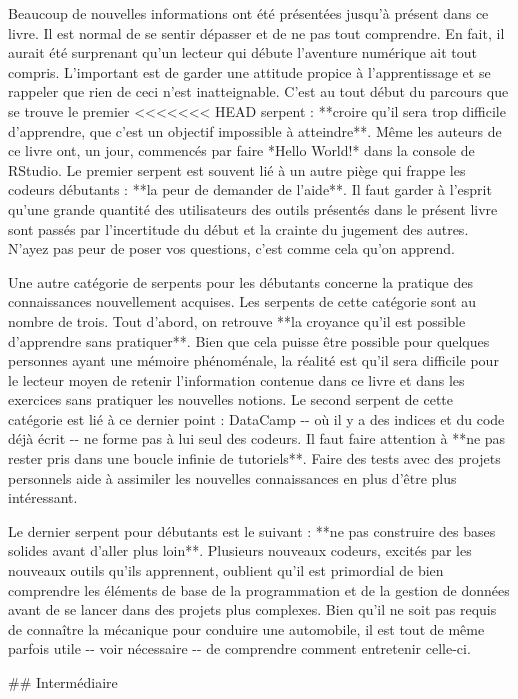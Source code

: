 \documentclass[
  letterpaper,
]{scrbook}
\begin{document}
Beaucoup de nouvelles informations ont été présentées jusqu'à présent
dans ce livre. Il est normal de se sentir dépasser et de ne pas tout
comprendre. En fait, il aurait été surprenant qu'un lecteur qui débute
l'aventure numérique ait tout compris. L'important est de garder une
attitude propice à l'apprentissage et se rappeler que rien de ceci n'est
inatteignable. C'est au tout début du parcours que se trouve le premier
<<<<<<< HEAD
serpent : **croire qu'il sera trop difficile d'apprendre, que c'est un
objectif impossible à atteindre**. Même les auteurs de ce livre ont, un
jour, commencés par faire *Hello World!* dans la console de RStudio. Le
premier serpent est souvent lié à un autre piège qui frappe les codeurs
débutants : **la peur de demander de l'aide**. Il faut garder à l'esprit
qu'une grande quantité des utilisateurs des outils présentés dans le
présent livre sont passés par l'incertitude du début et la crainte du
jugement des autres. N'ayez pas peur de poser vos questions, c'est comme
cela qu'on apprend.

Une autre catégorie de serpents pour les débutants concerne la pratique
des connaissances nouvellement acquises. Les serpents de cette catégorie
sont au nombre de trois. Tout d'abord, on retrouve **la croyance qu'il
est possible d'apprendre sans pratiquer**. Bien que cela puisse être
possible pour quelques personnes ayant une mémoire phénoménale, la
réalité est qu'il sera difficile pour le lecteur moyen de retenir
l'information contenue dans ce livre et dans les exercices sans
pratiquer les nouvelles notions. Le second serpent de cette catégorie
est lié à ce dernier point : DataCamp -\/- où il y a des indices et du
code déjà écrit -\/- ne forme pas à lui seul des codeurs. Il faut faire
attention à **ne pas rester pris dans une boucle infinie de tutoriels**.
Faire des tests avec des projets personnels aide à assimiler les
nouvelles connaissances en plus d'être plus intéressant.

Le dernier serpent pour débutants est le suivant : **ne pas construire
des bases solides avant d'aller plus loin**. Plusieurs nouveaux codeurs,
excités par les nouveaux outils qu'ils apprennent, oublient qu'il est
primordial de bien comprendre les éléments de base de la programmation
et de la gestion de données avant de se lancer dans des projets plus
complexes. Bien qu'il ne soit pas requis de connaître la mécanique pour
conduire une automobile, il est tout de même parfois utile -\/- voir
nécessaire -\/- de comprendre comment entretenir celle-ci.

\#\# Intermédiaire
\end{document}
